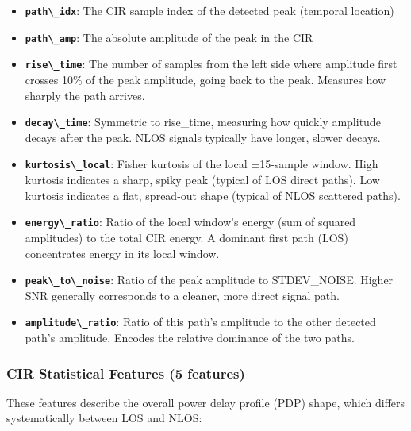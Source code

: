 \documentclass[12pt,a4paper]{article}
\newcommand{\passthrough}[1]{#1}
\providecommand{\passthrough}[1]{#1}
\providecommand{\tightlist}{%
  \setlength{\itemsep}{0pt}\setlength{\parskip}{0pt}}
\begin{document}
\begin{itemize}
\tightlist
\item
  \textbf{\passthrough{\lstinline!path\_idx!}}: The CIR sample index of
  the detected peak (temporal location)
\item
  \textbf{\passthrough{\lstinline!path\_amp!}}: The absolute amplitude
  of the peak in the CIR
\item
  \textbf{\passthrough{\lstinline!rise\_time!}}: The number of samples
  from the left side where amplitude first crosses 10\% of the peak
  amplitude, going back to the peak. Measures how sharply the path
  arrives.
\item
  \textbf{\passthrough{\lstinline!decay\_time!}}: Symmetric to
  rise\_time, measuring how quickly amplitude decays after the peak.
  NLOS signals typically have longer, slower decays.
\item
  \textbf{\passthrough{\lstinline!kurtosis\_local!}}: Fisher kurtosis of
  the local ±15-sample window. High kurtosis indicates a sharp, spiky
  peak (typical of LOS direct paths). Low kurtosis indicates a flat,
  spread-out shape (typical of NLOS scattered paths).
\item
  \textbf{\passthrough{\lstinline!energy\_ratio!}}: Ratio of the local
  window's energy (sum of squared amplitudes) to the total CIR energy. A
  dominant first path (LOS) concentrates energy in its local window.
\item
  \textbf{\passthrough{\lstinline!peak\_to\_noise!}}: Ratio of the peak
  amplitude to STDEV\_NOISE. Higher SNR generally corresponds to a
  cleaner, more direct signal path.
\item
  \textbf{\passthrough{\lstinline!amplitude\_ratio!}}: Ratio of this
  path's amplitude to the other detected path's amplitude. Encodes the
  relative dominance of the two paths.
\end{itemize}

\subsubsection{CIR Statistical Features (5
features)}\label{cir-statistical-features-5-features}

These features describe the overall power delay profile (PDP) shape,
which differs systematically between LOS and NLOS:
\end{document}

